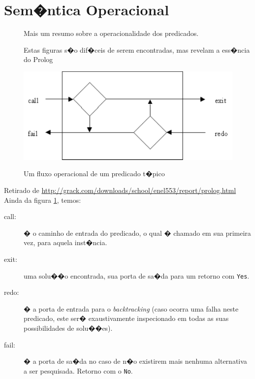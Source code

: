 \documentclass[final,a4paper]{article}
\begin{document}
\section{Sem�ntica Operacional}

\begin{description}
\item [] Mais um resumo sobre a operacionalidade dos predicados.
\item [] Estas figuras s�o dif�ceis de serem encontradas, mas revelam
a ess�ncia do Prolog
\end{description}

\begin{figure}[!htb]
\centering
\includegraphics[scale=0.8]{figuras/fluxo_predicado_1.pdf}
%
\label{fig_fluxo_1}
\caption{Um fluxo operacional de um predicado t�pico}
\end{figure}


\newpage
\begin{flushleft}


 Retirado de \url{http://grack.com/downloads/school/enel553/report/prolog.html}\\
 Ainda da figura \ref{fig_fluxo_1}, temos:
\end{flushleft}

\begin{description}
\item [call:] � o caminho de entrada do predicado, o qual � chamado
em sua primeira vez, para aquela inst�ncia.
\item [exit:] uma solu��o encontrada, sua porta de sa�da para um
retorno com \texttt{Yes}.
\item [redo:] � a porta de entrada para o {\em backtracking} (caso
ocorra uma falha neste predicado, este ser� exaustivamente inspecionado
em todas as suas possibilidades de solu��es).
\item [fail:] � a porta de sa�da no caso de n�o existirem mais
nenhuma alternativa a ser pesquisada. Retorno com o \texttt{No}.
\end{description}
\end{document}
